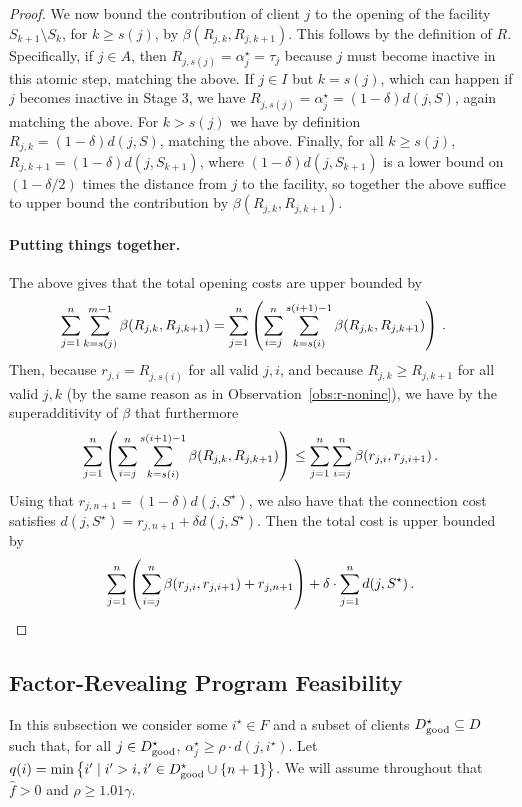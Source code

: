 \begin{proof}
    We now bound the contribution of client $j$ to the opening of the facility $S_{k+1} \setminus S_{k}$, for $k \geq s(j)$, by $\beta(R_{j,k}, R_{j,k+1})$.
    This follows by the definition of $R$.
    Specifically, if $j \in A$, then $R_{j,s(j)} = \alpha_j^\star = \tau_j$ because $j$ must become inactive in this atomic step, matching the above.
    If $j \in I$ but $k = s(j)$, which can happen if $j$ becomes inactive in Stage 3, we have $R_{j,s(j)} = \alpha_j^\star = (1-\delta)d(j, S)$, again matching the above.
    For $k > s(j)$ we have by definition $R_{j, k} = (1-\delta)d(j, S)$, matching the above.
    Finally, for all $k \geq s(j)$, $R_{j,k+1} = (1-\delta) d(j, S_{k+1})$, where $(1-\delta)d(j, S_{k+1})$ is a lower bound on $(1-\delta/2)$ times the distance from $j$ to the facility, so together the above suffice to upper bound the contribution by $\beta(R_{j,k}, R_{j,k+1})$.
    
    \paragraph{Putting things together.}
    The above gives that the total opening costs are upper bounded by
    \begin{align*}
    \sum_{j=1}^n \sum_{k=s(j)}^{m-1} \beta(R_{j,k}, R_{j, k+1})
    &= \sum_{j=1}^n \left(\sum_{i=j}^n \sum_{k=s(i)}^{s(i+1)-1} \beta(R_{j,k}, R_{j, k+1})\right)\,.
    \end{align*}
    Then, because $r_{j,i} = R_{j,s(i)}$ for all valid $j,i$, and because $R_{j,k} \geq R_{j,k+1}$ for all valid $j,k$ (by the same reason as in Observation~\ref{obs:r-noninc}), we have by the superadditivity of $\beta$ that furthermore
    \[\sum_{j=1}^n \left(\sum_{i=j}^n \sum_{k=s(i)}^{s(i+1)-1} \beta(R_{j,k}, R_{j, k+1})\right) \leq \sum_{j=1}^n \sum_{i=j}^n \beta(r_{j,i}, r_{j,i+1})\,.\]
    Using that $r_{j,n+1} = (1-\delta)d(j, S^\star)$, we also have that the connection cost satisfies $d(j, S^\star) = r_{j,n+1} + \delta d(j, S^\star)$.
    Then the total cost is upper bounded by
    \[\sum_{j=1}^n \left(\sum_{i=j}^{n} \beta(r_{j,i}, r_{j,i+1}) + r_{j,n+1}\right) + \delta \cdot \sum_{j=1}^n d(j,S^\star)\,.\]
\end{proof}

\subsection{Factor-Revealing Program Feasibility}
\label{sec:fr-feasiblity}
In this subsection we consider some $i^\star \in F$ and a subset of clients $D^\star_{\mathrm{good}} \subseteq D$ such that, for all $j \in D^\star_{\mathrm{good}}$, $\alpha_j^\star \geq \rho \cdot d(j, i^\star)$.
Let $q(i) = \min \left\{i' \mid i' > i, i' \in D^\star_{\mathrm{good}} \cup \{n+1\}\right\}$.
We will assume throughout that $\hat{f} > 0$ and $\rho \geq 1.01 \gamma$.

